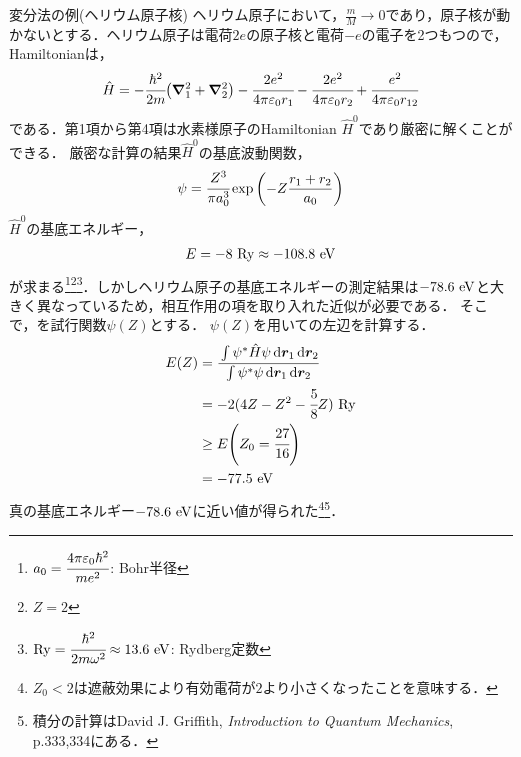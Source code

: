 \documentclass{report}
\begin{document}
  \begin{myex}{変分法の例(ヘリウム原子核)}{}
    ヘリウム原子において，$\frac{m}{M}\to 0$であり，原子核が動かないとする．ヘリウム原子は電荷$2e$の原子核と電荷$-e$の電子を2つもつので，Hamiltonianは，
    \begin{align}
      \hat{H} = -\cfrac{\hbar^2}{2m}\qty(\grad_{1}^{2} + \grad_{2}^{2}) - \cfrac{2e^2}{4\pi \epsilon_0 r_1}-\cfrac{2e^2}{4\pi \epsilon_0 r_2} + \cfrac{e^2}{4\pi \epsilon_0 r_{12}}
    \end{align}
    である．第1項から第4項は水素様原子のHamiltonian $\hat{H}^0$であり厳密に解くことができる．
    厳密な計算の結果$\hat{H}^0$の基底波動関数，
    \begin{align}
      \psi = \cfrac{Z^3}{\pi a_0^3}\exp\qty(-Z\frac{r_1 + r_2}{a_0})\label{helium}
    \end{align}
    $\hat{H}^0$の基底エネルギー，
    \begin{align}
      E = -8\ \r{Ry}\approx -108.8\ \r{eV}
    \end{align}
    が求まる\footnote{
      $a_0=\cfrac{4\pi\epsilon_0\hbar^2}{me^2}$: Bohr半径
    }\footnote{
      $Z = 2$
    }\footnote{
      $\r{Ry} = \cfrac{\hbar^2}{2m\omega^2} \approx 13.6 \ \r{eV}$: Rydberg定数
    }．しかしヘリウム原子の基底エネルギーの測定結果は$-78.6\ \r{eV}$と大きく異なっているため，相互作用の項を取り入れた近似が必要である．
    そこで，を試行関数$\psi(Z)$とする．
    $\psi(Z)$を用いての左辺を計算する．
    \begin{align}
      E(Z) &= \cfrac{\int\psi^{*}\hat{H}\psi \dd{\bm{r}_1}\dd{\bm{r}_2}}{\int\psi^{*}\psi \dd{\bm{r}_1}\dd{\bm{r}_2}} \\
      &= -2(4Z - Z^2 - \cfrac{5}{8}Z)\ \mathrm{Ry}\\ 
      &\ge E\qty(Z_0 = \cfrac{27}{16})\\
      &=-77.5\ \r{eV}
    \end{align}
    真の基底エネルギー$-78.6\ \r{eV}$に近い値が得られた\footnote{
      $Z_0 < 2$は遮蔽効果により有効電荷が$2$より小さくなったことを意味する．
    }\footnote{
      積分の計算はDavid J. Griffith, \textit{Introduction to Quantum Mechanics}, p.333,334にある．
    }．
  \end{myex}
\end{document}
